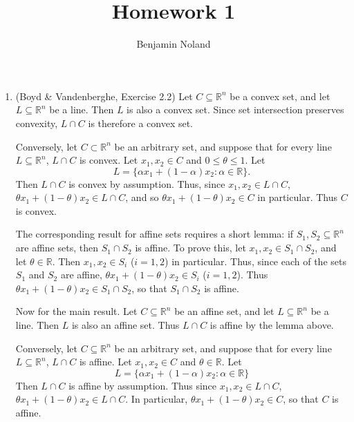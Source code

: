 \documentclass[letterpaper,12pt]{article}
\title{Homework 1}
\author{Benjamin Noland}
\date{}
\begin{document}
\maketitle

\begin{enumerate}
\item (Boyd \& Vandenberghe, Exercise 2.2) Let
  $C \subseteq \mathbb{R}^n$ be a convex set, and let
  $L \subseteq \mathbb{R}^n$ be a line. Then $L$ is also a convex
  set. Since set intersection preserves convexity, $L \cap C$ is
  therefore a convex set.

  Conversely, let $C \subset \mathbb{R}^n$ be an arbitrary set, and
  suppose that for every line $L \subseteq \mathbb{R}^n$, $L \cap C$
  is convex. Let $x_1, x_2 \in C$ and $0 \leq \theta \leq 1$. Let
  \begin{equation*}
    L = \{\alpha x_1 + (1 - \alpha) x_2 : \alpha \in \mathbb{R}\}.
  \end{equation*}
  Then $L \cap C$ is convex by assumption. Thus, since
  $x_1, x_2 \in L \cap C$,
  $\theta x_1 + (1 - \theta) x_2 \in L \cap C$, and so
  $\theta x_1 + (1 - \theta) x_2 \in C$ in particular. Thus $C$ is
  convex.

  \bigskip

  The corresponding result for affine sets requires a short lemma: if
  $S_1, S_2 \subseteq \mathbb{R}^n$ are affine sets, then
  $S_1 \cap S_2$ is affine. To prove this, let
  $x_1, x_2 \in S_1 \cap S_2$, and let $\theta \in \mathbb{R}$. Then
  $x_1, x_2 \in S_i$ ($i = 1, 2$) in particular. Thus, since each of
  the sets $S_1$ and $S_2$ are affine,
  $\theta x_1 + (1 - \theta) x_2 \in S_i$ ($i = 1, 2$). Thus
  $\theta x_1 + (1 - \theta) x_2 \in S_1 \cap S_2$, so that
  $S_1 \cap S_2$ is affine.

  Now for the main result. Let $C \subseteq \mathbb{R}^n$ be an affine
  set, and let $L \subseteq \mathbb{R}^n$ be a line. Then $L$ is also
  an affine set. Thus $L \cap C$ is affine by the lemma above.

  Conversely, let $C \subseteq \mathbb{R}^n$ be an arbitrary set, and
  suppose that for every line $L \subseteq \mathbb{R}^n$, $L \cap C$
  is affine. Let $x_1, x_2 \in C$ and $\theta \in \mathbb{R}$. Let
  \begin{equation*}
    L = \{\alpha x_1 + (1 - \alpha) x_2 : \alpha \in \mathbb{R}\}
  \end{equation*}
  Then $L \cap C$ is affine by assumption. Thus since
  $x_1, x_2 \in L \cap C$,
  $\theta x_1 + (1 - \theta) x_2 \in L \cap C$. In particular,
  $\theta x_1 + (1 - \theta) x_2 \in C$, so that $C$ is affine.


\end{enumerate}
\end{document}

